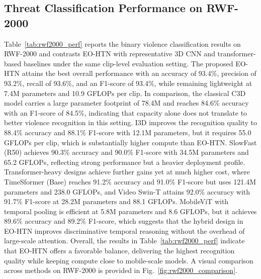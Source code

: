 \documentclass[AMA,Times1COL]{WileyNJDv5} %
\begin{document}
\subsection{Threat Classification Performance on RWF-2000}
Table~\ref{tab:rwf2000_perf} reports the binary violence classification results on RWF-2000 and contrasts EO-HTN with representative 3D CNN and transformer-based baselines under the same clip-level evaluation setting. The proposed EO-HTN attains the best overall performance with an accuracy of 93.4\%, precision of 93.2\%, recall of 93.6\%, and an F1-score of 93.4\%, while remaining lightweight at 7.4M parameters and 10.9 GFLOPs per clip. In comparison, the classical C3D model carries a large parameter footprint of 78.4M and reaches 84.6\% accuracy with an F1-score of 84.5\%, indicating that capacity alone does not translate to better violence recognition in this setting. I3D improves the recognition quality to 88.4\% accuracy and 88.1\% F1-score with 12.1M parameters, but it requires 55.0 GFLOPs per clip, which is substantially higher compute than EO-HTN. SlowFast (R50) achieves 90.3\% accuracy and 90.0\% F1-score with 34.5M parameters and 65.2 GFLOPs, reflecting strong performance but a heavier deployment profile. Transformer-heavy designs achieve further gains yet at much higher cost, where TimeSformer (Base) reaches 91.2\% accuracy and 91.0\% F1-score but uses 121.4M parameters and 238.0 GFLOPs, and Video Swin-T attains 92.0\% accuracy with 91.7\% F1-score at 28.2M parameters and 88.1 GFLOPs. MobileViT with temporal pooling is efficient at 5.8M parameters and 8.6 GFLOPs, but it achieves 89.6\% accuracy and 89.2\% F1-score, which suggests that the hybrid design in EO-HTN improves discriminative temporal reasoning without the overhead of large-scale attention. Overall, the results in Table~\ref{tab:rwf2000_perf} indicate that EO-HTN offers a favorable balance, delivering the highest recognition quality while keeping compute close to mobile-scale models. A visual comparison across methods on RWF-2000 is provided in Fig.~\ref{fig:rwf2000_comparison}.
\end{document}

